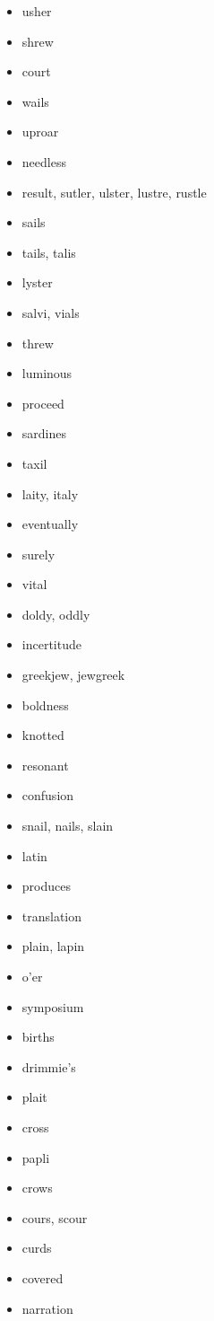 \documentclass{article}
\begin{document}
\begin{itemize}
    \item usher
    \item shrew
    \item court
    \item wails
    \item uproar
    \item needless
    \item result, sutler, ulster, lustre, rustle
    \item sails
    \item tails, talis
    \item lyster
    \item salvi, vials
    \item threw
    \item luminous
    \item proceed
    \item sardines
    \item taxil
    \item laity, italy
    \item eventually
    \item surely
    \item vital
    \item doldy, oddly
    \item incertitude
    \item greekjew, jewgreek
    \item boldness
    \item knotted
    \item resonant
    \item confusion
    \item snail, nails, slain
    \item latin
    \item produces
    \item translation
    \item plain, lapin
    \item o'er
    \item symposium
    \item births
    \item drimmie's
    \item plait
    \item cross
    \item papli
    \item crows
    \item cours, scour
    \item curds
    \item covered
    \item narration

\end{itemize}
\end{document}
